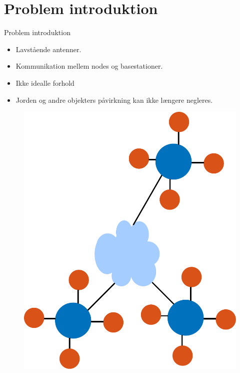 \section{Problem introduktion}
\begin{frame}{Problem introduktion}
\begin{minipage}{0.5\textwidth}

\begin{itemize}
\item Lavstående antenner.
\item Kommunikation mellem nodes og basestationer.
\item Ikke idealle forhold
\item Jorden og andre objekters påvirkning kan ikke længere negleres.
\end{itemize}

\end{minipage}
\begin{minipage}{0.45\textwidth}

\begin{figure}[!htbp]
 \centering
  \includegraphics[width = \columnwidth]{figures/wsn_ill.pdf}
  \end{figure}

\end{minipage}
\end{frame}

